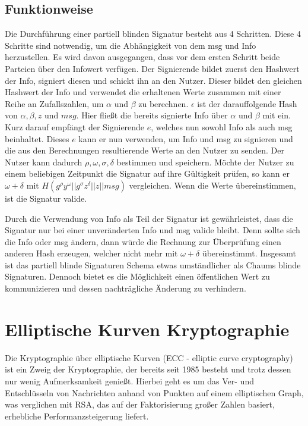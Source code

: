 \documentclass[
	fontsize=12pt,
	headings=small,
	parskip=half,           %
	bibliography=totoc,
	numbers=noenddot,       %
	open=any,               %
]{scrreprt}
\begin{document}
\subsection{Funktionweise}
Die Durchführung einer partiell blinden Signatur besteht aus 4 Schritten. Diese 4 Schritte sind notwendig, um die Abhängigkeit von dem msg und Info herzustellen. Es wird davon ausgegangen, dass vor dem ersten Schritt beide Parteien über den Infowert verfügen. Der Signierende bildet zuerst den Hashwert der Info, signiert diesen und schickt ihn an den Nutzer. Dieser bildet den gleichen Hashwert der Info und verwendet die erhaltenen Werte zusammen mit einer Reihe an Zufallszahlen, um $\alpha$ und $\beta$ zu berechnen. $\epsilon$ ist der darauffolgende Hash von $\alpha,\beta,z$ und $msg$. Hier fließt die bereits signierte Info über $\alpha$ und $\beta$ mit ein. Kurz darauf empfängt der Signierende $e$, welches nun sowohl Info als auch msg beinhaltet. Dieses $e$ kann er nun verwenden, um Info und msg zu signieren und die aus den Berechnungen resultierende Werte an den Nutzer zu senden. Der Nutzer kann dadurch $\rho,\omega,\sigma,\delta$ bestimmen und speichern. Möchte der Nutzer zu einem beliebigen Zeitpunkt die Signatur auf ihre Gültigkeit prüfen, so kann er $\omega + \delta$ mit  $H (g^\rho y^\omega || g^\sigma z^\delta || z || msg)$ vergleichen. Wenn die Werte übereinstimmen, ist die Signatur valide.

Durch die Verwendung von Info als Teil der Signatur ist gewährleistet, dass die Signatur nur bei einer unveränderten Info und msg valide bleibt. Denn sollte sich die Info oder msg ändern, dann würde die Rechnung zur Überprüfung einen anderen Hash erzeugen, welcher nicht mehr mit $\omega+\delta$ übereinstimmt. Insgesamt ist das partiell blinde Signaturen Schema etwas umständlicher als Chaums blinde Signaturen. Dennoch bietet es die Möglichkeit einen öffentlichen Wert zu kommunizieren und dessen nachträgliche Änderung zu verhindern.


\section{Elliptische Kurven Kryptographie}
\label{sec:ecc}
Die Kryptographie über elliptische Kurven (ECC - elliptic curve cryptography) ist ein Zweig der Kryptographie, der bereits seit 1985 besteht \cite{ecc-miller1985use} und trotz dessen nur wenig Aufmerksamkeit genießt. Hierbei geht es um das Ver- und Entschlüsseln von Nachrichten anhand von Punkten auf einem elliptischen Graph, was verglichen mit RSA, das auf der Faktorisierung großer Zahlen basiert, erhebliche Performanzsteigerung liefert.
\end{document}
